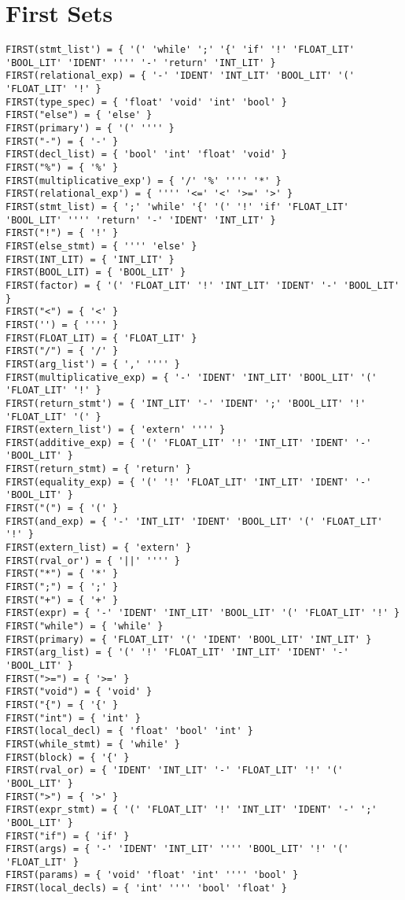 \documentclass[10pt,a4paper]{article}
\begin{document}
\section*{First Sets}
{
\small
\begin{verbatim}
FIRST(stmt_list') = { '(' 'while' ';' '{' 'if' '!' 'FLOAT_LIT' 'BOOL_LIT' 'IDENT' '''' '-' 'return' 'INT_LIT' }
FIRST(relational_exp) = { '-' 'IDENT' 'INT_LIT' 'BOOL_LIT' '(' 'FLOAT_LIT' '!' }
FIRST(type_spec) = { 'float' 'void' 'int' 'bool' }
FIRST("else") = { 'else' }
FIRST(primary') = { '(' '''' }
FIRST("-") = { '-' }
FIRST(decl_list) = { 'bool' 'int' 'float' 'void' }
FIRST("%") = { '%' }
FIRST(multiplicative_exp') = { '/' '%' '''' '*' }
FIRST(relational_exp') = { '''' '<=' '<' '>=' '>' }
FIRST(stmt_list) = { ';' 'while' '{' '(' '!' 'if' 'FLOAT_LIT' 'BOOL_LIT' '''' 'return' '-' 'IDENT' 'INT_LIT' }
FIRST("!") = { '!' }
FIRST(else_stmt) = { '''' 'else' }
FIRST(INT_LIT) = { 'INT_LIT' }
FIRST(BOOL_LIT) = { 'BOOL_LIT' }
FIRST(factor) = { '(' 'FLOAT_LIT' '!' 'INT_LIT' 'IDENT' '-' 'BOOL_LIT' }
FIRST("<") = { '<' }
FIRST('') = { '''' }
FIRST(FLOAT_LIT) = { 'FLOAT_LIT' }
FIRST("/") = { '/' }
FIRST(arg_list') = { ',' '''' }
FIRST(multiplicative_exp) = { '-' 'IDENT' 'INT_LIT' 'BOOL_LIT' '(' 'FLOAT_LIT' '!' }
FIRST(return_stmt') = { 'INT_LIT' '-' 'IDENT' ';' 'BOOL_LIT' '!' 'FLOAT_LIT' '(' }
FIRST(extern_list') = { 'extern' '''' }
FIRST(additive_exp) = { '(' 'FLOAT_LIT' '!' 'INT_LIT' 'IDENT' '-' 'BOOL_LIT' }
FIRST(return_stmt) = { 'return' }
FIRST(equality_exp) = { '(' '!' 'FLOAT_LIT' 'INT_LIT' 'IDENT' '-' 'BOOL_LIT' }
FIRST("(") = { '(' }
FIRST(and_exp) = { '-' 'INT_LIT' 'IDENT' 'BOOL_LIT' '(' 'FLOAT_LIT' '!' }
FIRST(extern_list) = { 'extern' }
FIRST(rval_or') = { '||' '''' }
FIRST("*") = { '*' }
FIRST(";") = { ';' }
FIRST("+") = { '+' }
FIRST(expr) = { '-' 'IDENT' 'INT_LIT' 'BOOL_LIT' '(' 'FLOAT_LIT' '!' }
FIRST("while") = { 'while' }
FIRST(primary) = { 'FLOAT_LIT' '(' 'IDENT' 'BOOL_LIT' 'INT_LIT' }
FIRST(arg_list) = { '(' '!' 'FLOAT_LIT' 'INT_LIT' 'IDENT' '-' 'BOOL_LIT' }
FIRST(">=") = { '>=' }
FIRST("void") = { 'void' }
FIRST("{") = { '{' }
FIRST("int") = { 'int' }
FIRST(local_decl) = { 'float' 'bool' 'int' }
FIRST(while_stmt) = { 'while' }
FIRST(block) = { '{' }
FIRST(rval_or) = { 'IDENT' 'INT_LIT' '-' 'FLOAT_LIT' '!' '(' 'BOOL_LIT' }
FIRST(">") = { '>' }
FIRST(expr_stmt) = { '(' 'FLOAT_LIT' '!' 'INT_LIT' 'IDENT' '-' ';' 'BOOL_LIT' }
FIRST("if") = { 'if' }
FIRST(args) = { '-' 'IDENT' 'INT_LIT' '''' 'BOOL_LIT' '!' '(' 'FLOAT_LIT' }
FIRST(params) = { 'void' 'float' 'int' '''' 'bool' }
FIRST(local_decls) = { 'int' '''' 'bool' 'float' }

\end{verbatim}}
\end{document}
